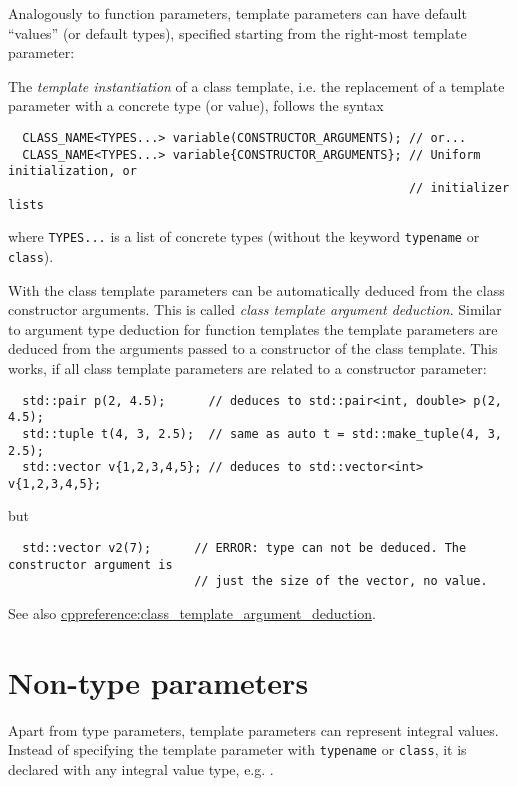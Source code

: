 \begin{rem}
  Analogously to function parameters, template parameters can have default ``values'' (or default types), specified starting from the right-most template
  parameter:
\end{rem}

The \emph{template instantiation} of a class template, i.e. the replacement of a template parameter with a concrete type (or value), follows the syntax
\begin{verbatim}
  CLASS_NAME<TYPES...> variable(CONSTRUCTOR_ARGUMENTS); // or...
  CLASS_NAME<TYPES...> variable{CONSTRUCTOR_ARGUMENTS}; // Uniform initialization, or
                                                        // initializer lists
\end{verbatim}
where \texttt{TYPES...} is a list of concrete types (without the keyword \texttt{typename} or \texttt{class}).

\begin{rem}
  With \marginpar{[\cxx{17}]} the class template parameters can be automatically deduced from the class constructor arguments. This
  is called \emph{class template argument deduction}. Similar to argument type deduction for function templates the template parameters
  are deduced from the arguments passed to a constructor of the class template. This works, if all class template parameters are related to
  a constructor parameter:
  \begin{verbatim}
  std::pair p(2, 4.5);      // deduces to std::pair<int, double> p(2, 4.5);
  std::tuple t(4, 3, 2.5);  // same as auto t = std::make_tuple(4, 3, 2.5);
  std::vector v{1,2,3,4,5}; // deduces to std::vector<int> v{1,2,3,4,5};
  \end{verbatim}
  but
  \begin{verbatim}
  std::vector v2(7);      // ERROR: type can not be deduced. The constructor argument is
                          // just the size of the vector, no value.
  \end{verbatim}

  See also \href{https://en.cppreference.com/w/cpp/language/class_template_argument_deduction}{cppreference:class\_template\_argument\_deduction}.
\end{rem}



\section{Non-type parameters}\label{sec:non_type_parameters}
Apart from type parameters, template parameters can represent integral values. Instead of specifying the template parameter with \texttt{typename} or
\texttt{class}, it is declared with any integral value type, e.g. .

